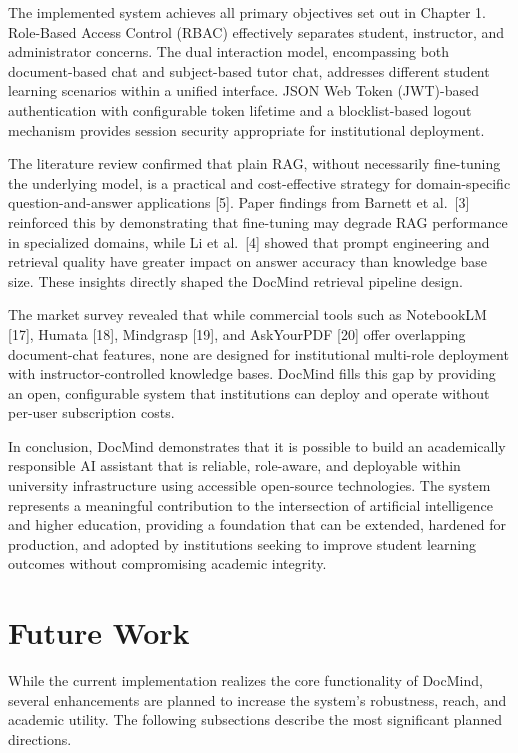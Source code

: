 \documentclass[12pt, a4paper, oneside]{report}
\let\oldsection\section
\renewcommand{\section}{%
  \addtocontents{toc}{\protect\needspace{4\baselineskip}}%
  \oldsection
}
\begin{document}
The implemented system achieves all primary objectives set out in Chapter 1. Role-Based Access Control (RBAC) effectively separates student, instructor, and administrator concerns. The dual interaction model, encompassing both document-based chat and subject-based tutor chat, addresses different student learning scenarios within a unified interface. JSON Web Token (JWT)-based authentication with configurable token lifetime and a blocklist-based logout mechanism provides session security appropriate for institutional deployment.

The literature review confirmed that plain RAG, without necessarily fine-tuning the underlying model, is a practical and cost-effective strategy for domain-specific question-and-answer applications [5]. Paper findings from Barnett et al.\ [3] reinforced this by demonstrating that fine-tuning may degrade RAG performance in specialized domains, while Li et al.\ [4] showed that prompt engineering and retrieval quality have greater impact on answer accuracy than knowledge base size. These insights directly shaped the DocMind retrieval pipeline design.

The market survey revealed that while commercial tools such as NotebookLM [17], Humata [18], Mindgrasp [19], and AskYourPDF [20] offer overlapping document-chat features, none are designed for institutional multi-role deployment with instructor-controlled knowledge bases. DocMind fills this gap by providing an open, configurable system that institutions can deploy and operate without per-user subscription costs.

\newpage

In conclusion, DocMind demonstrates that it is possible to build an academically responsible AI assistant that is reliable, role-aware, and deployable within university infrastructure using accessible open-source technologies. The system represents a meaningful contribution to the intersection of artificial intelligence and higher education, providing a foundation that can be extended, hardened for production, and adopted by institutions seeking to improve student learning outcomes without compromising academic integrity.

\section{Future Work}

While the current implementation realizes the core functionality of DocMind, several enhancements are planned to increase the system's robustness, reach, and academic utility. The following subsections describe the most significant planned directions.
\end{document}
